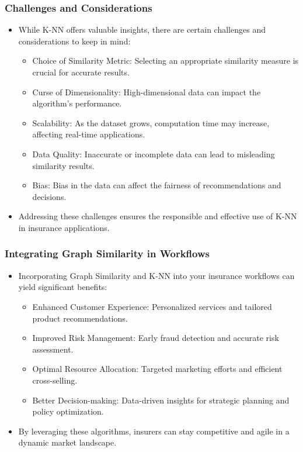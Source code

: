 \begin{frame}[fragile]\frametitle{Challenges and Considerations}
\begin{itemize}
\item While K-NN offers valuable insights, there are certain challenges and considerations to keep in mind:
\begin{itemize}
\item Choice of Similarity Metric: Selecting an appropriate similarity measure is crucial for accurate results.
\item Curse of Dimensionality: High-dimensional data can impact the algorithm's performance.
\item Scalability: As the dataset grows, computation time may increase, affecting real-time applications.
\item Data Quality: Inaccurate or incomplete data can lead to misleading similarity results.
\item Bias: Bias in the data can affect the fairness of recommendations and decisions.
\end{itemize}
\item Addressing these challenges ensures the responsible and effective use of K-NN in insurance applications.
\end{itemize}
\end{frame}

\begin{frame}[fragile]\frametitle{Integrating Graph Similarity in Workflows}
\begin{itemize}
\item Incorporating Graph Similarity and K-NN into your insurance workflows can yield significant benefits:
\begin{itemize}
\item Enhanced Customer Experience: Personalized services and tailored product recommendations.
\item Improved Risk Management: Early fraud detection and accurate risk assessment.
\item Optimal Resource Allocation: Targeted marketing efforts and efficient cross-selling.
\item Better Decision-making: Data-driven insights for strategic planning and policy optimization.
\end{itemize}
\item By leveraging these algorithms, insurers can stay competitive and agile in a dynamic market landscape.
\end{itemize}
\end{frame}

